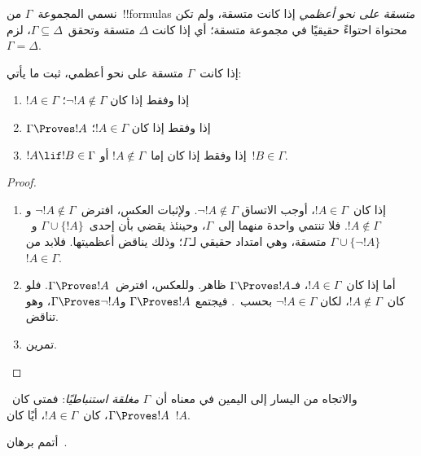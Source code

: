 \documentclass[../../../include/open-logic-section]{subfiles}
\begin{document}


\begin{defn}
نسمي المجموعة~$\Gamma$ من~!!{formula}s \emph{متسقة على نحو أعظمي} إذا
كانت متسقة، ولم تكن محتواة احتواءً حقيقيًا في مجموعة متسقة؛ أي إذا كانت
$\Delta$ متسقة وتحقق~$\Gamma\subseteq\Delta$، لزم~$\Gamma=\Delta$.
\end{defn}

\begin{lem}[لمّة الصدق]
إذا كانت~$\Gamma$ متسقة على نحو أعظمي، ثبت ما يأتي:
\begin{enumerate}
\item {} $!A\in\Gamma$ إذا وفقط إذا كان
  $\lnot !A\notin\Gamma$؛
\item {} $\Gamma\Proves !A$ إذا وفقط إذا كان
  $!A\in\Gamma$؛
\item {} $!A\lif !B\in\Gamma$ إذا وفقط إذا كان
  إما~$!A\notin\Gamma$ أو~$!B\in\Gamma$.
\end{enumerate}
\end{lem}

\begin{proof}
\begin{enumerate}
\item إذا كان~$!A\in\Gamma$، أوجب الاتساق
  $\lnot !A\notin\Gamma$. ولإثبات العكس، افترض~$\lnot !A\notin\Gamma$
  و$!A\notin\Gamma$. فلا تنتمي واحدة منهما إلى~$\Gamma$، وحينئذ يقضي
   بأن إحدى~$\Gamma\cup\{!A\}$
  و~$\Gamma\cup\{\lnot !A\}$ متسقة، وهي امتداد حقيقي لـ$\Gamma$؛ وذلك
  يناقض أعظميتها. فلابد من~$!A\in\Gamma$.
\item أما إذا كان~$!A\in\Gamma$، فـ$\Gamma\Proves !A$ ظاهر. وللعكس،
  افترض~$\Gamma\Proves !A$. فلو كان~$!A\notin\Gamma$، لكان
  $\lnot !A\in\Gamma$ بحسب~. فيجتمع
  $\Gamma\Proves !A$ و$\Gamma\Proves\lnot !A$، وهو تناقض.
\item تمرين.
\end{enumerate}
\end{proof}

والاتجاه من اليسار إلى اليمين في
 معناه أن~$\Gamma$ \emph{مغلقة
استنباطيًا}: فمتى كان~$\Gamma\Proves !A$، كان~$!A\in\Gamma$، أيًا كان~$!A$.

\begin{prob}
  أتمم برهان~.
\end{prob}
\end{document}
